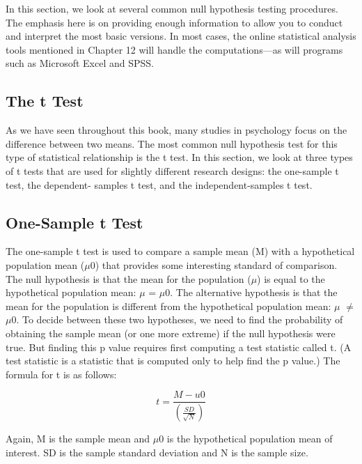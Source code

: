  

In this section, we look at several common null hypothesis testing procedures. The emphasis here is on providing enough information to allow you to conduct and interpret the most basic versions. In most cases, the online statistical analysis tools mentioned in Chapter 12 will handle the computations---as will programs such as Microsoft Excel and SPSS.




\subsection{The t Test}



As we have seen throughout this book, many studies in psychology focus on the difference between two means. The most common null hypothesis test for this type of statistical relationship is the t test. In this section, we look at three types of t tests that are used for slightly different research designs: the one-sample t test, the dependent- samples t test, and the independent-samples t test.




\subsection{One-Sample t Test}




The one-sample t test is used to compare a sample mean (M) with a hypothetical population mean ($\mu$0) that provides some interesting standard of comparison. The null hypothesis is that the mean for the population ($\mu$) is equal to the hypothetical population mean: $\mu$ = $\mu$0. The alternative hypothesis is that the mean for the population is different from the hypothetical population mean: $\mu$ $\neq$ $\mu$0. To decide between these two hypotheses, we need to find the probability of obtaining the sample mean (or one more extreme) if the null hypothesis were true. But finding this p value requires first computing a test statistic called t. (A test statistic is a statistic that is computed only to help find the p value.) The formula for t is as follows:
  


\begin{equation}
t = \frac{M-u0}{ \left( \frac{SD}{\sqrt{N}} \right) }
\end{equation}

Again, M is the sample mean and $\mu$0 is the hypothetical population mean of interest. SD is the sample standard deviation and N is the sample size.


